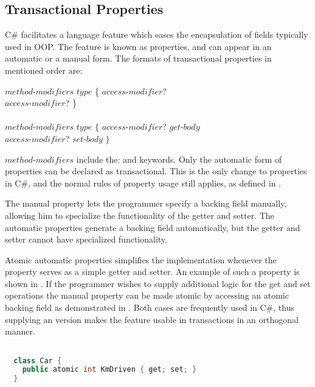 \subsection{Transactional Properties}\label{subsec:design_properties}
C\# facilitates a language feature which eases the encapsulation of fields typically used in \ac{OOP}. The feature is known as properties, and can appear in an automatic or a manual form. The formats of transactional properties in mentioned order are\cite[p. 52]{sestoft2011c}:

 $method$-$modifiers$ $type$  \{ $access$-$modifier$? \bscode{;} \\ $access$-$modifier$? \bscode{;} \}
\\\\
$method$-$modifiers$ $type$  $\{$ $access$-$modifier$?  $get$-$body$ \\ $access$-$modifier$?  $set$-$body$ $\}$

$method$-$modifiers$ include the:      and  keywords.
Only the automatic form of properties can be declared as transactional. This is the only change to properties in C\#, and the normal rules of property usage still applies, as defined in \cite[p. 52]{sestoft2011c}.

The manual property lets the programmer specify a backing field manually, allowing him to specialize the functionality of the getter and setter. The automatic properties generate a backing field automatically, but the getter and setter cannot have specialized functionality.

Atomic automatic properties simplifies the implementation whenever the property serves as a simple getter and setter. An example of such a property is shown in . If the programmer wishes to supply additional logic for the get and set operations the manual property can be made atomic by accessing an atomic backing field as demonstrated in . Both cases are frequently used in C\#, thus supplying an  version makes the feature usable in transactions in an orthogonal manner.

\begin{lstlisting}[label=lst:auto_atomic_property,
 caption={Automatic Transactional Properties},
 language=Java, 
 showspaces=false,
 showtabs=false,
 breaklines=true,
 showstringspaces=false,
 breakatwhitespace=true,
 commentstyle=\color{greencomments},
 keywordstyle=\color{bluekeywords},
 stringstyle=\color{redstrings},
 morekeywords={atomic, retry, orElse, var, get, set}]  % Start your code-block

  class Car {
    public atomic int KmDriven { get; set; }
  }
\end{lstlisting}

